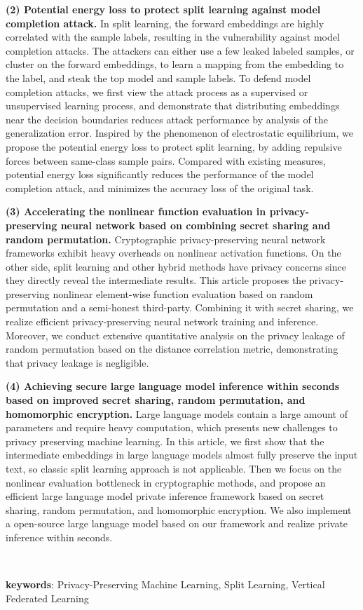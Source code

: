 \textbf{(2) Potential energy loss to protect split learning against model completion attack.}
In split learning, the forward embeddings are highly correlated with the sample labels, resulting in the vulnerability against model completion attacks.
%
The attackers can either use a few leaked labeled samples, or cluster on the forward embeddings, to learn a mapping from the embedding to the label, and steak the top model and sample labels.
%
To defend model completion attacks, we first view the attack process as a supervised or unsupervised learning process, and demonstrate that distributing embeddings near the decision boundaries reduces attack performance by analysis of the generalization error.
%
Inspired by the phenomenon of electrostatic equilibrium, we propose the potential energy loss to protect split learning, by adding repulsive forces between same-class sample pairs.
%
Compared with existing measures, potential energy loss significantly reduces the performance of the model completion attack, and minimizes the accuracy loss of the original task.


\textbf{(3) Accelerating the nonlinear function evaluation in privacy-preserving neural network based on combining secret sharing and random permutation.}
Cryptographic privacy-preserving neural network frameworks exhibit heavy overheads on nonlinear activation functions.
On the other side, split learning and other hybrid methods have privacy concerns since they directly reveal the intermediate results.
%
This article proposes the privacy-preserving nonlinear element-wise function evaluation based on random permutation and a semi-honest third-party.
%
Combining it with secret sharing, we realize efficient privacy-preserving neural network training and inference.
%
Moreover, we conduct extensive quantitative analysis on the privacy leakage of random permutation based on the distance correlation metric, demonstrating that privacy leakage is negligible.

\textbf{(4) Achieving secure large language model inference within seconds based on improved secret sharing, random permutation, and homomorphic encryption.}
Large language models contain a large amount of parameters and require heavy computation, which presents new challenges to privacy preserving machine learning.
%
In this article, we first show that the intermediate embeddings in large language models almost fully preserve the input text, so classic split learning approach is not applicable.
%
Then we focus on the nonlinear evaluation bottleneck in cryptographic methods, and propose an efficient large language model private inference framework based on secret sharing, random permutation, and homomorphic encryption.
%
We also implement a open-source large language model based on our framework and realize private inference within seconds.
%

~

\noindent \textbf{keywords}: Privacy-Preserving Machine Learning, Split Learning, Vertical Federated Learning